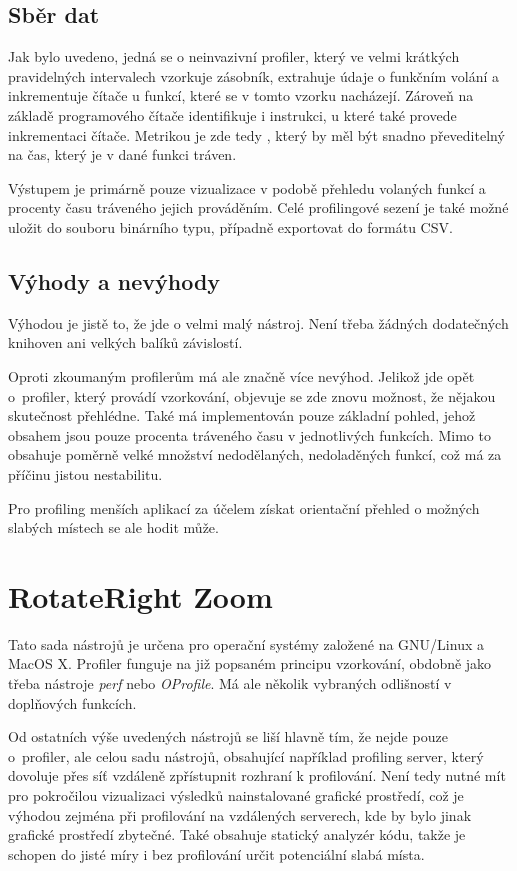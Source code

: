 \documentclass[czech,BP]{thesiskiv}
\begin{document}
\subsection*{Sběr dat}

Jak bylo uvedeno, jedná se o neinvazivní profiler, který ve velmi krátkých pravidelných intervalech vzorkuje zásobník, extrahuje údaje o funkčním volání a inkrementuje čítače u funkcí, které se v tomto vzorku nacházejí. Zároveň na základě programového čítače identifikuje i instrukci, u které také provede inkrementaci čítače. Metrikou je zde tedy , který by měl být snadno převeditelný na čas, který je v dané funkci tráven.

Výstupem je primárně pouze vizualizace v podobě přehledu volaných funkcí a procenty času tráveného jejich prováděním. Celé profilingové sezení je také možné uložit do souboru binárního typu, případně exportovat do formátu CSV.

\subsection*{Výhody a nevýhody}

Výhodou je jistě to, že jde o velmi malý nástroj. Není třeba žádných dodatečných knihoven ani velkých balíků závislostí.

Oproti zkoumaným profilerům má ale značně více nevýhod. Jelikož jde opět o~profiler, který provádí vzorkování, objevuje se zde znovu možnost, že nějakou skutečnost přehlédne. Také má implementován pouze základní pohled, jehož obsahem jsou pouze procenta tráveného času v jednotlivých funkcích. Mimo to obsahuje poměrně velké množství nedodělaných, nedoladěných funkcí, což má za příčinu jistou nestabilitu.

Pro profiling menších aplikací za účelem získat orientační přehled o možných slabých místech se ale hodit může.





\section{RotateRight Zoom}

Tato sada nástrojů je určena pro operační systémy založené na GNU/Linux a MacOS X. Profiler funguje na již popsaném principu vzorkování, obdobně jako třeba nástroje \emph{perf} nebo \emph{OProfile}. Má ale několik vybraných odlišností v doplňových funkcích.

Od ostatních výše uvedených nástrojů se liší hlavně tím, že nejde pouze o~profiler, ale celou sadu nástrojů, obsahující například profiling server, který dovoluje přes síť vzdáleně zpřístupnit rozhraní k profilování. Není tedy nutné mít pro pokročilou vizualizaci výsledků nainstalované grafické prostředí, což je výhodou zejména při profilování na vzdálených serverech, kde by bylo jinak grafické prostředí zbytečné. Také obsahuje statický analyzér kódu, takže je schopen do jisté míry i bez profilování určit potenciální slabá místa.
\end{document}
